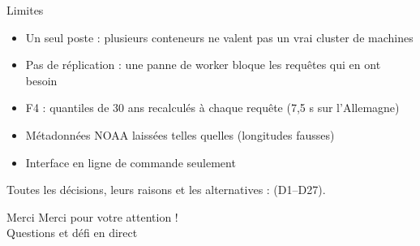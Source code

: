 \documentclass[aspectratio=169]{pres}
\begin{document}
\begin{frame}{Limites}
  \begin{itemize}
    \item Un seul poste : plusieurs conteneurs ne valent pas un vrai cluster de machines
    \item Pas de réplication : une panne de worker bloque les requêtes qui en ont besoin
    \item F4 : quantiles de 30 ans recalculés à chaque requête (7,5 s sur l'Allemagne)
    \item Métadonnées NOAA laissées telles quelles (longitudes fausses)
    \item Interface en ligne de commande seulement
  \end{itemize}
  \vspace{0.5em}
  \small Toutes les décisions, leurs raisons et les alternatives :  (D1--D27).
\end{frame}

\begin{frame}{Merci}
  \centering\Large Merci pour votre attention !\\[1em]
  \normalsize Questions et défi en direct
\end{frame}
\end{document}
